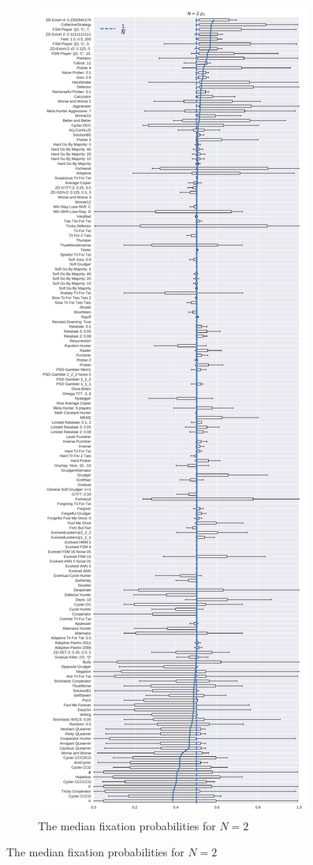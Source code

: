\documentclass{article}
\begin{document}
\begin{figure}[!hbtp]
\begin{subfigure}[t]{.6\textwidth}
        \includegraphics[height=.8\textheight]{./img/boxplot_2_invade.pdf}
        \caption{The median fixation probabilities for \(N=2\)}
        \label{fig:boxplot_2}
    \end{subfigure}
\end{figure}
\end{document}
